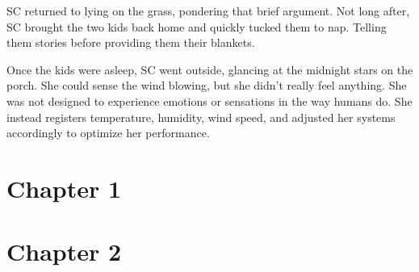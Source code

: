 \documentclass[12pt]{book}
\begin{document}
\clearpage

SC returned to lying on the grass, pondering that brief
argument. Not long after, SC brought the two kids back
home and quickly tucked them to nap. Telling them stories
before providing them their blankets. 

Once the kids were asleep, SC went outside, glancing at
the midnight stars on the porch. She could sense the wind
blowing, but she didn't really feel anything. She was not
designed to experience emotions or sensations in the way
humans do. She instead registers temperature, humidity,
wind speed, and adjusted her systems accordingly to
optimize her performance.

\section*{Chapter 1}

\section*{Chapter 2}
\end{document}
